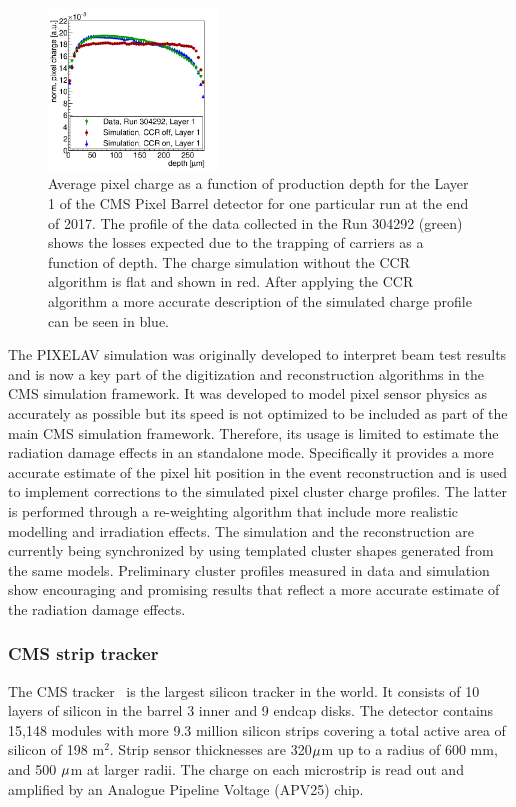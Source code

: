 \begin{figure}[htp]
\centering
\includegraphics[width=0.40\textwidth]{figures/SensorSimulation/chargeProfileAll.png}
\caption{ Average pixel charge as a function of production depth for the Layer 1 of the CMS Pixel Barrel detector for one particular run at the end of 2017. 
The profile of the data collected in the Run 304292 (green) shows the losses expected due to the trapping of carriers as a function of depth. 
The charge simulation without the CCR algorithm is flat and shown in red.
After applying the CCR algorithm a more accurate description of the simulated charge profile can be seen in blue.
}
\label{fig:ccr}
\end{figure}

The PIXELAV simulation was originally developed to interpret beam test results and is now a key part of the digitization and reconstruction algorithms in the CMS simulation framework.
It was developed to model pixel sensor physics as accurately as possible but its speed is not optimized to be included as part of the main CMS simulation framework.
Therefore, its usage is limited to estimate the radiation damage effects in an standalone mode.
Specifically it provides a more accurate estimate of the pixel hit position in the event reconstruction and is used to implement corrections to the simulated pixel cluster charge profiles.
The latter is performed through a re-weighting algorithm that include more realistic modelling and irradiation effects. 
The simulation and the reconstruction are currently being synchronized by using templated cluster shapes generated from the same models.
Preliminary cluster profiles measured in data and simulation show encouraging and promising results that reflect a more accurate estimate of the radiation damage effects.


\subsubsection{CMS strip tracker}
The CMS tracker~\cite{CMS:1998aa,CMS:2000eqx} is the largest silicon tracker in the world.
It consists of 10 layers of silicon in the barrel 3 inner and 9 endcap disks. 
The detector contains 15,148 modules with more 9.3 million silicon strips covering a total active area of silicon of 198 m$^2$.
Strip sensor thicknesses are 320$\micro$m up to a radius of 600 mm, and 500 $\micro$m at larger radii.
The charge on each microstrip is read out and amplified by an Analogue Pipeline Voltage (APV25) chip.

